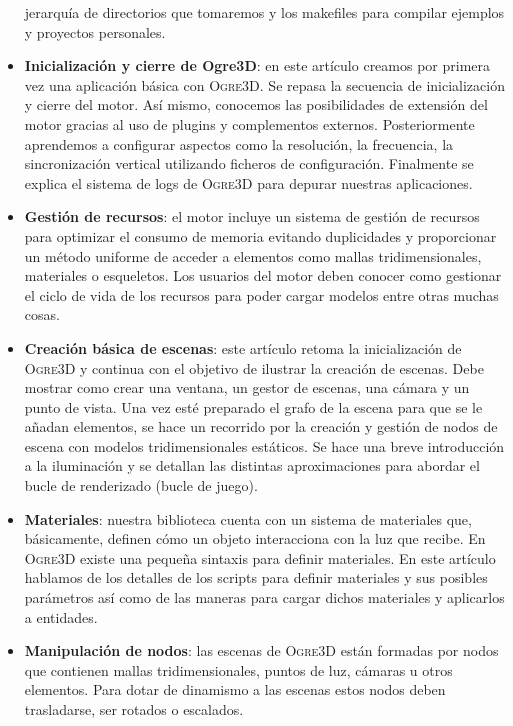 \begin{itemize}
    jerarquía de directorios que tomaremos y los makefiles para compilar
    ejemplos y proyectos personales.
    \item \textbf{Inicialización y cierre de Ogre3D}: en este artículo
    creamos por primera vez una aplicación básica con \textsc{Ogre3D}. Se
    repasa la secuencia de inicialización y cierre del motor. Así mismo,
    conocemos las posibilidades de extensión del motor gracias al uso
    de plugins y complementos externos. Posteriormente aprendemos a configurar
    aspectos como la resolución, la frecuencia, la sincronización vertical
    utilizando ficheros de configuración. Finalmente se explica el sistema
    de logs de \textsc{Ogre3D} para depurar nuestras aplicaciones.
    \item \textbf{Gestión de recursos}: el motor incluye un sistema de gestión
    de recursos para optimizar el consumo de memoria evitando duplicidades
    y proporcionar un método uniforme de acceder a elementos como mallas
    tridimensionales, materiales o esqueletos. Los usuarios del motor
    deben conocer como gestionar el ciclo de vida de los recursos para poder
    cargar modelos entre otras muchas cosas.
    \item \textbf{Creación básica de escenas}: este artículo retoma la inicialización
    de \textsc{Ogre3D} y continua con el objetivo de ilustrar la creación
    de escenas. Debe mostrar como crear una ventana, un gestor de escenas,
    una cámara y un punto de vista. Una vez esté preparado el grafo de la escena
    para que se le añadan elementos, se hace un recorrido por la creación
    y gestión de nodos de escena con modelos tridimensionales estáticos.
    Se hace una breve introducción a la iluminación y se detallan las distintas
    aproximaciones para abordar el bucle de renderizado (bucle de juego).
    \item \textbf{Materiales}: nuestra biblioteca cuenta con un sistema
    de materiales que, básicamente, definen cómo un objeto interacciona
    con la luz que recibe. En \textsc{Ogre3D} existe una pequeña sintaxis
    para definir materiales. En este artículo hablamos de los detalles
    de los scripts para definir materiales y sus posibles parámetros así
    como de las maneras para cargar dichos materiales y aplicarlos a entidades.
    \item \textbf{Manipulación de nodos}: las escenas de \textsc{Ogre3D}
    están formadas por nodos que contienen mallas tridimensionales, 
    puntos de luz, cámaras u otros elementos. Para dotar de dinamismo
    a las escenas estos nodos deben trasladarse, ser rotados o escalados.

\end{itemize}
